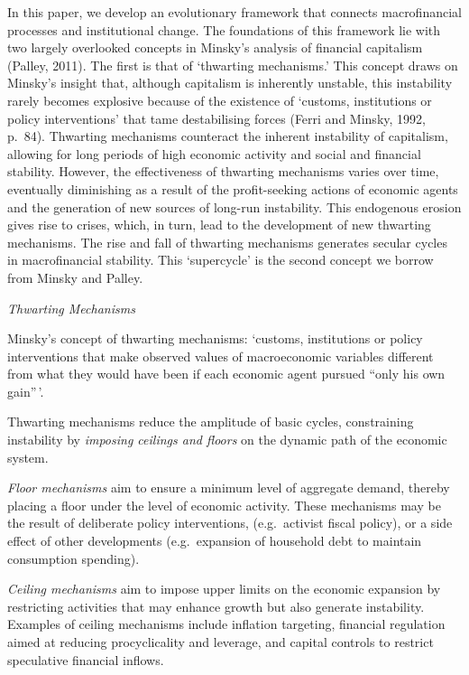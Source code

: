 \documentclass[
]{book}
\begin{document}
In this paper, we develop an evolutionary framework that connects macrofinancial processes and
institutional change. The foundations of this framework lie with two largely overlooked concepts in
Minsky's analysis of financial capitalism (Palley, 2011). The first is that of `thwarting mechanisms.'
This concept draws on Minsky's insight that, although capitalism is inherently unstable, this instability
rarely becomes explosive because of the existence of `customs, institutions or policy interventions' that
tame destabilising forces (Ferri and Minsky, 1992, p.~84). Thwarting mechanisms counteract the
inherent instability of capitalism, allowing for long periods of high economic activity and social and
financial stability.
However, the effectiveness of thwarting mechanisms varies over time, eventually diminishing as a
result of the profit-seeking actions of economic agents and the generation of new sources of long-run
instability. This endogenous erosion gives rise to crises, which, in turn, lead to the development of new
thwarting mechanisms. The rise and fall of thwarting mechanisms generates secular cycles in
macrofinancial stability. This `supercycle' is the second concept we borrow from Minsky and Palley.

\emph{Thwarting Mechanisms}

Minsky's concept of thwarting mechanisms:
`customs, institutions or policy interventions that make observed values of
macroeconomic variables different from what they would have been
if each economic agent pursued ``only his own gain''\,'.

Thwarting mechanisms reduce the amplitude of basic cycles,
constraining instability by \emph{imposing ceilings and floors} on the dynamic path of the
economic system.

\emph{Floor mechanisms} aim to ensure a minimum level of aggregate demand,
thereby placing a floor under the level of economic activity. These
mechanisms may be the result of deliberate policy interventions,
(e.g.~activist fiscal policy), or a side effect of other developments
(e.g.~expansion of household debt to maintain consumption spending).

\emph{Ceiling mechanisms} aim to impose upper limits on the economic expansion by restricting
activities that may enhance growth but also generate instability.
Examples of ceiling mechanisms include inflation targeting,
financial regulation aimed at reducing procyclicality and leverage, and
capital controls to restrict speculative financial inflows.
\end{document}
